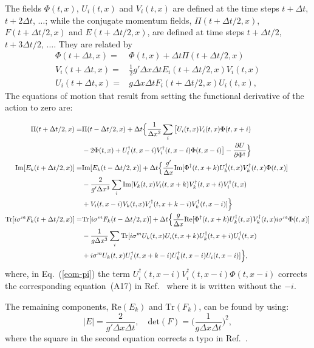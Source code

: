 \documentclass[prd,twocolumn,nofootinbib]{revtex4-1}
\begin{document}
The fields $\Phi(t,x)$, $U_i(t,x)$ and $V_i(t,x)$ are defined at the time steps 
$t+\Delta t$, $t+2\Delta t$, $\ldots$; while the conjugate momentum fields, 
$\Pi(t+\Delta t/2,x)$, $F(t+\Delta t/2,x)$ and $E(t+\Delta t/2,x)$, are 
defined at time steps $t+\Delta t/2$, $t+3\Delta t/2$, $\ldots$. They are related by
\begin{align}
\Phi(t+\Delta t,x) =& \Phi(t,x) +\Delta t \Pi(t+\Delta t/2,x) \\
V_i(t+\Delta t,x) =& \frac{1}{2} g'\Delta x \Delta t E_i(t+\Delta t/2,x) V_i(t,x) \\
U_i(t+\Delta t,x) =& g\Delta x \Delta t F_i(t+\Delta t/2,x) U_i(t,x), 
\end{align}
The equations of motion that result from setting the functional derivative
of the action to zero are:
\begin{widetext}
	\begin{align}
\Pi(t+\Delta t/2,x) =& \Pi(t-\Delta t/2,x)+\Delta t \Big\{ \frac{1}{\Delta x^2}\sum_i \big[ U_i(t,x)V_i(t,x)\Phi(t,x+i) \notag \\
	&-2\Phi(t,x)+U_i^\dagger(t,x-i) V_i^\dagger(t,x-i) \Phi(t,x-i)\big] - \frac{\partial U}{\partial \Phi^\dagger}\Big\}
\label{eom-pi}
		\\ 
\text{Im} [E_k(t+\Delta t/2,x)] =& \text{Im} [E_k(t-\Delta t/2,x)]+\Delta t \Big\{ \frac{g'}{\Delta x}\text{Im}[\Phi^\dagger(t,x+k)U^\dagger_k(t,x) V^\dagger_k(t,x) \Phi(t,x)] \notag \\
&-\frac{2}{g'\Delta x^3}\sum_i \text{Im} [V_k(t,x) V_i(t,x+k) V_k^\dagger (t,x+i) V_i^\dagger (t,x) \notag \\ 
&+ V_i(t,x-i) V_k(t,x) V_i^\dagger(t,x+k-i)V_k^\dagger(t,x-i)] \Big\} \\ 
\text{Tr} [i\sigma^m F_k(t+\Delta t/2,x)] =& \text{Tr} [i\sigma^m F_k(t-\Delta t/2,x)] +\Delta t\Big\{ \frac{g}{\Delta x} \text{Re} [\Phi^\dagger(t,x+k)U_k^\dagger(t,x)V_k^\dagger(t,x) i \sigma^m \Phi(t,x)] \notag \\
&-\frac{1}{g\Delta x^3}\sum_i \text{Tr} [ i\sigma^m U_k(t,x) U_i(t,x+k) U_k^\dagger(t,x+i) U_i^\dagger(t,x) \notag\\
&+i\sigma^m U_k(t,x) U_i^\dagger(t,x+k-i) U_k^\dagger(t,x-i) U_i(t,x-i) ]
		\Big\},
\end{align}
where, in Eq.~(\ref{eom-pi}) the term 
	$U_i^\dagger(t,x-i) V_i^\dagger(t,x-i) \Phi(t,x-i)$ corrects the 
	corresponding equation~(A17) in 
	Ref.~\cite{rajantie2001electroweak} where it is written without the $-i$.
\end{widetext}
The remaining components, $\text{Re} (E_k)$ and $\text{Tr} (F_k)$, can be 
found by using:
\begin{equation}
|E|=\frac{2}{g'\Delta x \Delta t}, \quad  \text{det}(F)=\Big( \frac{1}{g\Delta x \Delta t} \Big)^2,
\end{equation}
where the square in the second equation
corrects a typo in Ref.~\cite{rajantie2001electroweak}.
\end{document}
